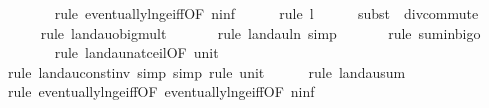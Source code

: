 \begin{isabellebody}
\ \ \ \ \ \ \isamarkupfalse%
\ {\isacharparenleft}{\kern0pt}rule\ eventually{\isacharunderscore}{\kern0pt}ln{\isacharunderscore}{\kern0pt}ge{\isacharunderscore}{\kern0pt}iff{\isacharbrackleft}{\kern0pt}OF\ n{\isacharunderscore}{\kern0pt}inf{\isacharbrackright}{\kern0pt}{\isacharparenright}{\kern0pt}\isanewline
\ \ \ \ \isamarkupfalse%
\ {\isacharparenleft}{\kern0pt}rule\ l{}{\isacharparenright}{\kern0pt}\isanewline
\ \ \ \ \isamarkupfalse%
\ {\isacharparenleft}{\kern0pt}subst\ {\isacharparenleft}{\kern0pt}{}{\isacharparenright}{\kern0pt}\ div{\isacharunderscore}{\kern0pt}commute{\isacharparenright}{\kern0pt}\isanewline
\ \ \ \ \isamarkupfalse%
\ {\isacharparenleft}{\kern0pt}rule\ landau{\isacharunderscore}{\kern0pt}o{\isachardot}{\kern0pt}big{\isacharunderscore}{\kern0pt}mult{\isacharunderscore}{\kern0pt}{}{\isacharparenright}{\kern0pt}\isanewline
\ \ \ \ \ \isamarkupfalse%
\ {\isacharparenleft}{\kern0pt}rule\ landau{\isacharunderscore}{\kern0pt}ln{\isacharunderscore}{\kern0pt}{}{\isacharcomma}{\kern0pt}\ simp{\isacharparenright}{\kern0pt}\isanewline
\ \ \ \ \ \isamarkupfalse%
\ {\isacharparenleft}{\kern0pt}rule\ sum{\isacharunderscore}{\kern0pt}in{\isacharunderscore}{\kern0pt}bigo{\isacharparenright}{\kern0pt}\isanewline
\ \ \ \ \ \ \isamarkupfalse%
\ {\isacharparenleft}{\kern0pt}rule\ landau{\isacharunderscore}{\kern0pt}nat{\isacharunderscore}{\kern0pt}ceil{\isacharbrackleft}{\kern0pt}OF\ unit{\isacharunderscore}{\kern0pt}{}{\isacharbrackright}{\kern0pt}{\isacharparenright}{\kern0pt}\isanewline
\ \ \ \ \ \isamarkupfalse%
\ {\isacharparenleft}{\kern0pt}rule\ landau{\isacharunderscore}{\kern0pt}const{\isacharunderscore}{\kern0pt}inv{\isacharcomma}{\kern0pt}\ simp{\isacharcomma}{\kern0pt}\ simp{\isacharcomma}{\kern0pt}\ rule\ unit{\isacharunderscore}{\kern0pt}{}{\isacharparenright}{\kern0pt}\isanewline
\ \ \ \ \isamarkupfalse%
\ {\isacharparenleft}{\kern0pt}rule\ landau{\isacharunderscore}{\kern0pt}sum{\isacharunderscore}{\kern0pt}{}{\isacharparenright}{\kern0pt}\isanewline
\ \ \ \ \ \ \isamarkupfalse%
\ {\isacharparenleft}{\kern0pt}rule\ eventually{\isacharunderscore}{\kern0pt}ln{\isacharunderscore}{\kern0pt}ge{\isacharunderscore}{\kern0pt}iff{\isacharbrackleft}{\kern0pt}OF\ eventually{\isacharunderscore}{\kern0pt}ln{\isacharunderscore}{\kern0pt}ge{\isacharunderscore}{\kern0pt}iff{\isacharbrackleft}{\kern0pt}OF\ n{\isacharunderscore}{\kern0pt}inf{\isacharbrackright}{\kern0pt}{\isacharbrackright}{\kern0pt}{\isacharparenright}{\kern0pt}\isanewline

\end{isabellebody}
